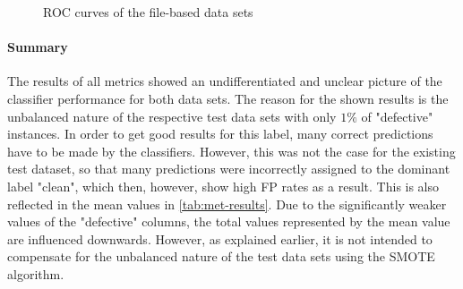\begin{figure}[t]
  \qquad
  \caption{ROC curves of the file-based data sets \label{roc-file}}
\end{figure}

\paragraph{Summary}

The results of all metrics showed an undifferentiated and unclear picture of the classifier performance for both data sets. The reason for the shown results is the unbalanced nature of the respective test data sets with only $1\%$ of "defective" instances. In order to get good results for this label, many correct predictions have to be made by the classifiers. However, this was not the case for the existing test dataset, so that many predictions were incorrectly assigned to the dominant label "clean", which then, however, show high FP rates as a result. This is also reflected in the mean values in \autoref{tab:met-results}. Due to the significantly weaker values of the "defective" columns, the total values represented by the mean value are influenced downwards. However, as explained earlier, it is not intended to compensate for the unbalanced nature of the test data sets using the SMOTE algorithm.